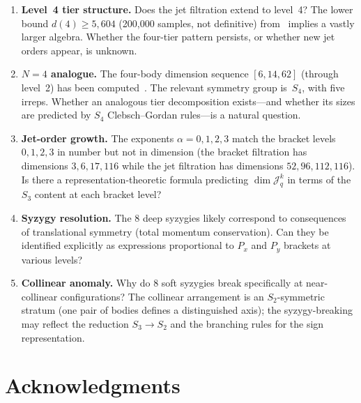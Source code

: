 \documentclass[11pt,a4paper]{article}
\theoremstyle{remark}
\newcommand{\cJ}{\mathcal{J}}
\newcommand{\SG}{S_3}
\begin{document}
\begin{enumerate}
  \item \textbf{Level~4 tier structure.}  Does the jet
    filtration extend to level~4?  The lower bound
    $d(4) \ge 5{,}604$ (200{,}000 samples, not definitive)
    from~\cite{paper1} implies a
    vastly larger algebra.  Whether the four-tier
    pattern persists, or whether new jet orders appear,
    is unknown.

  \item \textbf{$N = 4$ analogue.}  The four-body
    dimension sequence $[6, 14, 62]$ (through level~2)
    has been computed~\cite{paper1}.  The relevant
    symmetry group is~$S_4$, with five irreps.  Whether
    an analogous tier decomposition exists---and whether
    its sizes are predicted by $S_4$
    Clebsch--Gordan rules---is a natural question.

  \item \textbf{Jet-order growth.}  The exponents
    $\alpha = 0, 1, 2, 3$ match the bracket levels
    $0, 1, 2, 3$ in number but not in dimension
    (the bracket filtration has dimensions $3, 6, 17, 116$
    while the jet filtration has dimensions $52, 96, 112,
    116$).  Is there a representation-theoretic formula
    predicting $\dim \cJ^k_q$ in terms of the $\SG$
    content at each bracket level?

  \item \textbf{Syzygy resolution.}  The 8 deep syzygies
    likely correspond to consequences of translational
    symmetry (total momentum conservation).  Can they be
    identified explicitly as expressions proportional
    to $P_x$ and $P_y$ brackets at various levels?

  \item \textbf{Collinear anomaly.}  Why do 8 soft
    syzygies break specifically at near-collinear
    configurations?  The collinear arrangement is an
    $S_2$-symmetric stratum (one pair of bodies defines
    a distinguished axis); the syzygy-breaking may
    reflect the reduction $\SG \to S_2$ and the
    branching rules for the sign representation.
\end{enumerate}


\section*{Acknowledgments}
\end{document}
